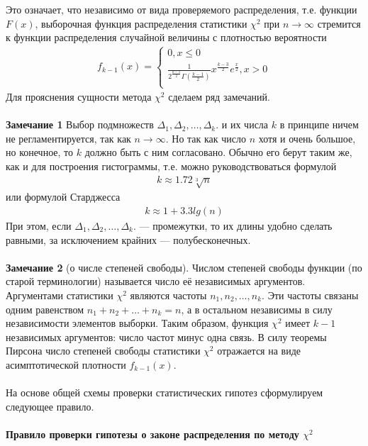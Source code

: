 Это означает, что независимо от вида проверяемого распределения, т.е. функции $F(x)$, выборочная функция распределения статистики $\chi^2$ при $n \longrightarrow \infty$ стремится к функции распределения случайной величины
с плотностью вероятности
\begin{gather}
    f_{k-1}(x) =
    \begin{cases}
        0, x \leq 0\\
        \frac{1}{2^{\frac{k-1}{2}}\Gamma \left(  \frac{k-1}{2}\right)}{x}^{\frac{k-3}{2}}{e}^{\frac{x}{2}},  x > 0 \\ 
    \end{cases}
\end{gather}
Для прояснения сущности метода $\chi^2$ сделаем ряд замечаний. \\ \\ 
\textbf{Замечание 1} Выбор подмножеств $\Delta_1,\Delta_2,\dots, \Delta_{k}.$ и их числа $k$ в
принципе ничем не регламентируется, так как $n \longrightarrow \infty$. Но так как число
$n$ хотя и очень большое, но конечное, то $k$ должно быть с ним согласовано. Обычно его берут таким же, как и для построения гистограммы,
т.е. можно руководствоваться формулой
\begin{gather}
    k \approx 1.72\sqrt[3]{n}
\end{gather}
или формулой Старджесса
\begin{gather}
    k \approx 1 + 3.3lg(n)
\end{gather}
При этом, если $\Delta_1,\Delta_2,\dots, \Delta_{k}.$ — промежутки, то их длины удобно
сделать равными, за исключением крайних — полубесконечных. \\ \\
\textbf{Замечание 2} (о числе степеней свободы).
Числом степеней свободы функции (по старой терминологии)
называется число её независимых аргументов. Аргументами статистики $\chi^2$ являются частоты $n_1, n_2, \dots, n_k$. Эти частоты связаны
одним равенством $n_1 + n_2 + \dots + n_k = n$, а в остальном
независимы в силу независимости элементов выборки. Таким образом,
функция $\chi^2$ имеет $k-1$ независимых аргументов: число частот
минус одна связь. В силу теоремы Пирсона число степеней свободы
статистики $\chi^2$ отражается на виде асимптотической плотности $f_{k-1}(x)$.\\ \\ 
На основе общей схемы проверки статистических гипотез сформулируем следующее правило.\\ \\
\textbf{ Правило проверки гипотезы о законе распределения по методу $\chi^2$}

